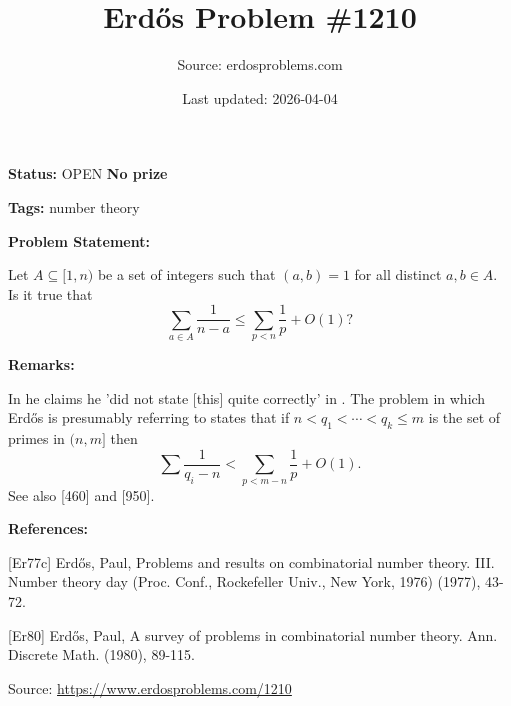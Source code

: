 \documentclass{article}
\title{Erd\H{o}s Problem \#1210}
\date{Last updated: 2026-04-04}
\author{Source: erdosproblems.com}
\begin{document}
\maketitle

\noindent\textbf{Status:} OPEN \quad \textbf{No prize}

\noindent\textbf{Tags:} number theory

\medskip
\noindent\textbf{Problem Statement:}

Let $A\subseteq [1,n)$ be a set of integers such that $(a,b)=1$ for all distinct $a,b\in A$. Is it true that\[\sum_{a\in A}\frac{1}{n-a}\leq \sum_{p<n}\frac{1}{p}+O(1)?\]

\bigskip
\noindent\textbf{Remarks:}

In \cite{Er80} he claims he 'did not state [this] quite correctly' in \cite{Er77c}. The problem in \cite{Er77c} which Erd\H{o}s is presumably referring to states that if $n<q_1<\cdots<q_k\leq m$ is the set of primes in $(n,m]$ then\[\sum \frac{1}{q_i-n}< \sum_{p<m-n}\frac{1}{p}+O(1).\]See also [460] and [950].

\bigskip
\noindent\textbf{References:}

[Er77c] Erd\H{o}s, Paul, Problems and results on combinatorial number theory. III. Number theory day (Proc. Conf., Rockefeller Univ.,
New York, 1976) (1977), 43-72.
 
 [Er80] Erd\H{o}s, Paul, A survey of problems in combinatorial number theory. Ann. Discrete Math. (1980), 89-115.

\bigskip
\noindent\small{Source: \url{https://www.erdosproblems.com/1210}}
\end{document}
